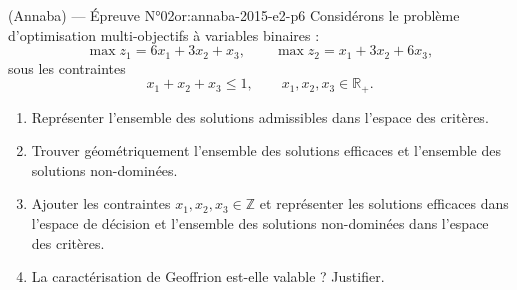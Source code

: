 \newpage
\begin{problem}{(Annaba) — Épreuve N°02}{or:annaba-2015-e2-p6}
Considérons le problème d'optimisation multi-objectifs à variables binaires :
$$\max z_1=6x_1+3x_2+x_3,\qquad \max z_2=x_1+3x_2+6x_3,$$
sous les contraintes
$$x_1+x_2+x_3\le1,\qquad x_1,x_2,x_3\in\mathbb{R}_+.$$
\begin{enumerate}\item Représenter l'ensemble des solutions admissibles dans l'espace des critères.\item Trouver géométriquement l'ensemble des solutions efficaces et l'ensemble des solutions non-dominées.\item Ajouter les contraintes $x_1,x_2,x_3\in\mathbb{Z}$ et représenter les solutions efficaces dans l'espace de décision et l'ensemble des solutions non-dominées dans l'espace des critères.\item La caractérisation de Geoffrion est-elle valable ? Justifier.\end{enumerate}
\end{problem}
